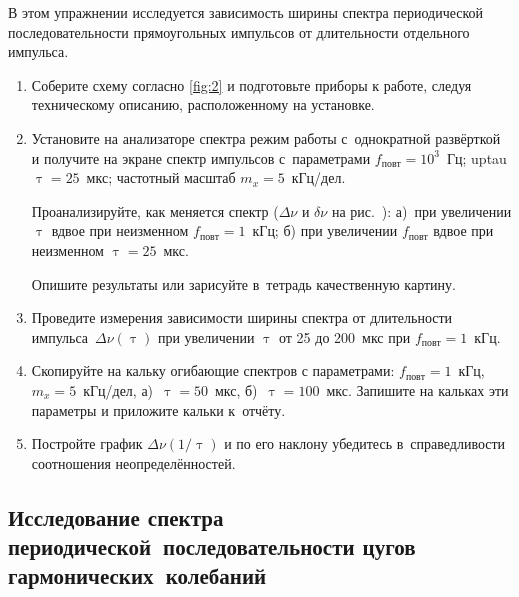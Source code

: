 \begin{lab:task}

В этом упражнении исследуется зависимость ширины спектра периодической последовательности прямоугольных импульсов от длительности отдельного импульса.

\begin{enumerate}
	\item Соберите схему согласно \ref{fig:2} и подготовьте приборы к работе, следуя техническому описанию, расположенному на установке.
	\item Установите на анализаторе спектра режим работы с~однократной развёрткой и получите на  экране спектр импульсов с~параметрами $f_{повт}=10^3$~Гц; uptau$\uptau=25$~мкс; частотный масштаб $m_x=5$~кГц/дел.

	Проанализируйте, как меняется спектр ($\Delta\nu$ и $\delta\nu$ на рис.~): а)~при увеличении $\uptau$ вдвое при неизменном $f_{повт}=1$~кГц; б) при увеличении $f_{повт}$ вдвое при неизменном $\uptau=25$~мкс.
	
	Опишите результаты или зарисуйте в~тетрадь качественную картину.
	\item Проведите измерения зависимости ширины спектра от длительности импульса~$\Delta \nu(\uptau)$ при увеличении $\uptau$ от 25 до 200~мкс при $f_{повт}=1$~кГц.
	\item Скопируйте на кальку  огибающие спектров с параметрами: $f_{повт}=1$~кГц, $m_x=5$~кГц/дел, а)~$\uptau=50$~мкс, б)~$\uptau=100$~мкс. Запишите на кальках эти параметры и приложите кальки к~отчёту.
	\item Постройте график $\Delta \nu(1/\uptau)$ и по его наклону убедитесь в~справедливости соотношения неопределённостей.
\end{enumerate}
\end{lab:task}

\subsection*{Исследование спектра периодической~последовательности цугов гармонических~колебаний}


